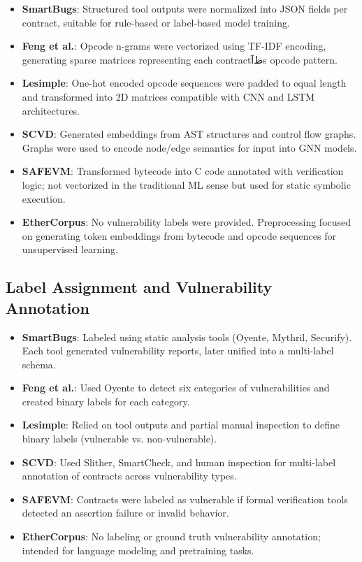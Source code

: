 \begin{itemize}
    \item \textbf{SmartBugs}: Structured tool outputs were normalized into JSON fields per contract, suitable for rule-based or label-based model training.
    \item \textbf{Feng et al.}: Opcode n-grams were vectorized using TF-IDF encoding, generating sparse matrices representing each contractظآs opcode pattern.
    \item \textbf{Lesimple}: One-hot encoded opcode sequences were padded to equal length and transformed into 2D matrices compatible with CNN and LSTM architectures.
    \item \textbf{SCVD}: Generated embeddings from AST structures and control flow graphs. Graphs were used to encode node/edge semantics for input into GNN models.
    \item \textbf{SAFEVM}: Transformed bytecode into C code annotated with verification logic; not vectorized in the traditional ML sense but used for static symbolic execution.
    \item \textbf{EtherCorpus}: No vulnerability labels were provided. Preprocessing focused on generating token embeddings from bytecode and opcode sequences for unsupervised learning.
\end{itemize}

\subsection*{Label Assignment and Vulnerability Annotation}

\begin{itemize}
    \item \textbf{SmartBugs}: Labeled using static analysis tools (Oyente, Mythril, Securify). Each tool generated vulnerability reports, later unified into a multi-label schema.
    \item \textbf{Feng et al.}: Used Oyente to detect six categories of vulnerabilities and created binary labels for each category.
    \item \textbf{Lesimple}: Relied on tool outputs and partial manual inspection to define binary labels (vulnerable vs. non-vulnerable).
    \item \textbf{SCVD}: Used Slither, SmartCheck, and human inspection for multi-label annotation of contracts across vulnerability types.
    \item \textbf{SAFEVM}: Contracts were labeled as vulnerable if formal verification tools detected an assertion failure or invalid behavior.
    \item \textbf{EtherCorpus}: No labeling or ground truth vulnerability annotation; intended for language modeling and pretraining tasks.
\end{itemize}


